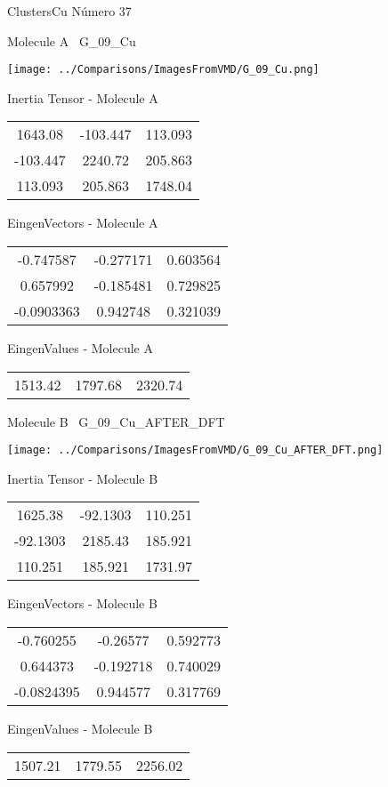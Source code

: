 \vtab[-3cm]
\begin{center}
{\large ClustersCu \tab Número 37}
\end{center}
\begin{multicols}{2}
\begin{center}

Molecule A \
G\_09\_Cu

\texttt{[image: ../Comparisons/ImagesFromVMD/G\_09\_Cu.png]}

Inertia Tensor - Molecule A \\
\begin{tabular}{|c c c|}
1643.08	 & 	-103.447	 & 	113.093	 \\
-103.447	 & 	2240.72	 & 	205.863	 \\
113.093	 & 	205.863	 & 	1748.04
\end{tabular}

\vtab
 EingenVectors - Molecule A     \\
\begin{tabular}{|c c c|}
-0.747587	 & 	-0.277171	 & 	0.603564	 \\
0.657992	 & 	-0.185481	 & 	0.729825	 \\
-0.0903363	 & 	0.942748	 & 	0.321039
\end{tabular}

\vtab
 EingenValues - Molecule A     \\
\begin{tabular}{|c c c|}
1513.42	 & 	1797.68	 & 	2320.74	 \\
\end{tabular}
\columnbreak

Molecule B \
G\_09\_Cu\_AFTER\_DFT

\texttt{[image: ../Comparisons/ImagesFromVMD/G\_09\_Cu\_AFTER\_DFT.png]}

Inertia Tensor - Molecule B \\
\begin{tabular}{|c c c|}
1625.38	 & 	-92.1303	 & 	110.251	 \\
-92.1303	 & 	2185.43	 & 	185.921	 \\
110.251	 & 	185.921	 & 	1731.97
\end{tabular}

\vtab
 EingenVectors - Molecule B     \\
\begin{tabular}{|c c c|}
-0.760255	 & 	-0.26577	 & 	0.592773	 \\
0.644373	 & 	-0.192718	 & 	0.740029	 \\
-0.0824395	 & 	0.944577	 & 	0.317769
\end{tabular}

\vtab
 EingenValues - Molecule B     \\
\begin{tabular}{|c c c|}
1507.21	 & 	1779.55	 & 	2256.02	 \\
\end{tabular}

\end{center}
\end{multicols}

